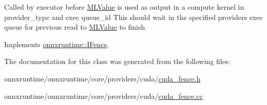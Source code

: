 Called by executor before \mbox{\hyperlink{classonnxruntime_1_1MLValue}{M\+L\+Value}} is used as output in a compute kernel in provider\+\_\+type and exec queue\+\_\+id This should wait in the specified provider\textquotesingle{}s exec queue for previous read to \mbox{\hyperlink{classonnxruntime_1_1MLValue}{M\+L\+Value}} to finish 

Implements \mbox{\hyperlink{classonnxruntime_1_1IFence_a0d93955cc57accb1a5e81b820fc9a7d5}{onnxruntime\+::\+I\+Fence}}.



The documentation for this class was generated from the following files\+:\begin{DoxyCompactItemize}
\item 
onnxruntime/onnxruntime/core/providers/cuda/\mbox{\hyperlink{cuda__fence_8h}{cuda\+\_\+fence.\+h}}\item 
onnxruntime/onnxruntime/core/providers/cuda/\mbox{\hyperlink{cuda__fence_8cc}{cuda\+\_\+fence.\+cc}}\end{DoxyCompactItemize}
